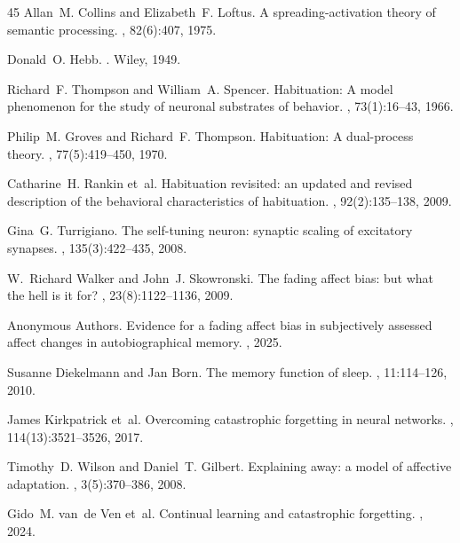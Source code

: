 \documentclass{article}
\begin{document}
\begin{thebibliography}{45}
Allan~M. Collins and Elizabeth~F. Loftus.
\newblock A spreading-activation theory of semantic processing.
, 82(6):407, 1975.

Donald~O. Hebb.
.
\newblock Wiley, 1949.

Richard~F. Thompson and William~A. Spencer.
\newblock Habituation: A model phenomenon for the study of neuronal
  substrates of behavior.
, 73(1):16--43, 1966.

Philip~M. Groves and Richard~F. Thompson.
\newblock Habituation: A dual-process theory.
, 77(5):419--450, 1970.

Catharine~H. Rankin et~al.
\newblock Habituation revisited: an updated and revised description of the
  behavioral characteristics of habituation.
, 92(2):135--138, 2009.

Gina~G. Turrigiano.
\newblock The self-tuning neuron: synaptic scaling of excitatory synapses.
, 135(3):422--435, 2008.

W.~Richard Walker and John~J. Skowronski.
\newblock The fading affect bias: but what the hell is it for?
, 23(8):1122--1136, 2009.

Anonymous Authors.
\newblock Evidence for a fading affect bias in subjectively assessed affect
  changes in autobiographical memory.
, 2025.

Susanne Diekelmann and Jan Born.
\newblock The memory function of sleep.
, 11:114--126, 2010.

James Kirkpatrick et~al.
\newblock Overcoming catastrophic forgetting in neural networks.
, 114(13):3521--3526, 2017.

Timothy~D. Wilson and Daniel~T. Gilbert.
\newblock Explaining away: a model of affective adaptation.
, 3(5):370--386, 2008.

Gido~M. van~de Ven et~al.
\newblock Continual learning and catastrophic forgetting.
, 2024.


\end{thebibliography}
\end{document}
